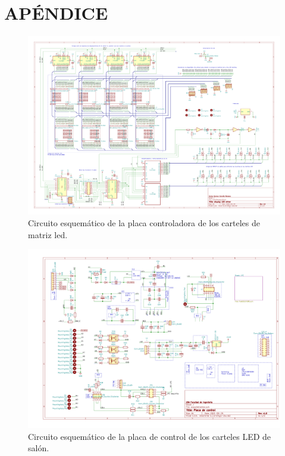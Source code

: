 \section{APÉNDICE}


\begin{figure}[H]
	\centering
	\includegraphics[width=1.66\textwidth, angle=90]{./Figures/output.driverled.pdf}
	\caption{Circuito esquemático de la placa controladora de los carteles de matriz led.}
	\label{fig:schDriverled}
\end{figure}

\begin{figure}[H]
	\centering
	\includegraphics[width=1.66\textwidth, angle=90]{./Figures/output.placaControl.pdf}
	\caption{Circuito esquemático de la placa de control de los carteles LED de salón.}
	\label{fig:schController}
\end{figure}